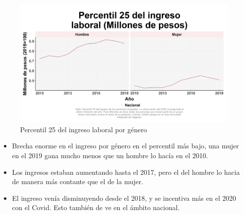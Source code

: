     \begin{figure}[H]
        \caption{Percentil 25 del ingreso laboral por género \label{map_result_2} }
        \begin{center}
        \includegraphics[width=\textwidth,keepaspectratio]{img/var_4_trend.png}
        \end{center}
    \end{figure}
            \begin{itemize}
                    \item Brecha enorme en el ingreso por género en el percentil más bajo, una mujer en el 2019 gana mucho menos que un hombre lo hacía en el 2010.
                    \item Los ingresos estaban aumentando hasta el 2017, pero el del hombre lo hacia de manera más contante que el de la mujer.
                    \item El ingreso venía disminuyendo desde el 2018, y se incentiva más en el 2020 con el Covid. Esto también de ve en el ámbito nacional.
                \end{itemize}

